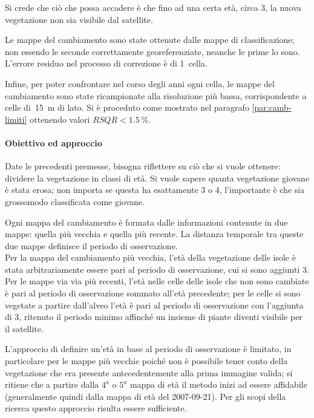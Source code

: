 Si crede che ciò che possa accadere è che fino ad una certa età, circa \SI{3}{\anni}, la nuova vegetazione non sia visibile dal satellite. 

Le mappe del cambiamento sono state ottenute dalle mappe di classificazione; non essendo le seconde correttamente georeferenziate, neanche le prime lo sono. L'errore residuo nel processo di correzione è di 1~cella.

Infine, per poter confrontare nel corso degli anni ogni cella, le mappe del cambiamento sono state ricampionate alla risoluzione più bassa, corrispondente a celle di~\SI{15}{\m} di lato. Si è proceduto come mostrato nel paragrafo \ref{par:camb-limiti} ottenendo valori $RSQR < \SI{1.5}{\percent}$.
 


\paragraph{Obiettivo ed approccio} 
Date le precedenti premesse, bisogna riflettere su ciò che si vuole ottenere: dividere la vegetazione in classi di età.
Si vuole sapere quanta vegetazione giovane è stata erosa; non importa se questa ha esattamente \SI{3}{\anni} o \SI{4}{\anni}, l'importante è che sia grossomodo classificata come giovane.

Ogni mappa del cambiamento è formata dalle informazioni contenute in due mappe: quella più vecchia e quella più recente. La distanza temporale tra queste due mappe definisce il periodo di osservazione.
\\
Per la mappa del cambiamento più vecchia, l'età della vegetazione delle isole è stata arbitrariamente essere pari al periodo di osservazione, cui si sono aggiunti \SI{3}{\anni}.
\\
Per le mappe via via più recenti, l'età nelle celle delle isole che non sono cambiate è pari al periodo di osservazione sommato all'età precedente; per le celle si sono vegetate a partire dall'alveo l'età è pari al periodo di osservazione con l'aggiunta di \SI{3}{\anni}, ritenuto il periodo minimo affinché un insieme di piante diventi visibile per il satellite.

\medskip
L'approccio di definire un'età in base al periodo di osservazione è limitato, in particolare per le mappe più vecchie poiché non è possibile tener conto della vegetazione che era presente antecedentemente alla prima immagine valida;
si ritiene che a partire dalla $4^a$ o $5^a$ mappa di età il metodo inizi ad essere affidabile (generalmente quindi dalla mappa di età del 2007-09-21).
Per gli scopi della ricerca questo approccio risulta essere sufficiente.

